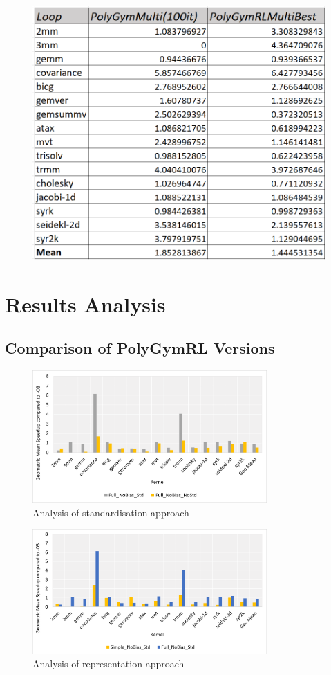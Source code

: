\documentclass[logo,msc]{infthesis}           %
\begin{document}
\begin{figure}
\centering
\includegraphics[width=0.7\linewidth]{Images/Benchmarking_Multiple.png}
\label{Benchmarking_Multiple}
\end{figure}


\chapter{Results Analysis}

\section{Comparison of PolyGymRL Versions}
\label{sec:Compare_Versions}

\begin{figure}[htbp]
  \centering
  \includegraphics[width=0.8\textwidth]{Images/Compare_Std.png}   
  \caption{Analysis of standardisation approach}
  \label{fig:Compare_Std} 
\end{figure}

\begin{figure}[htbp]
  \centering
  \includegraphics[width=0.8\textwidth]{Images/Compare_Rep.png}   
  \caption{Analysis of representation approach}
  \label{fig:Compare_Rep} 
\end{figure}
\end{document}
